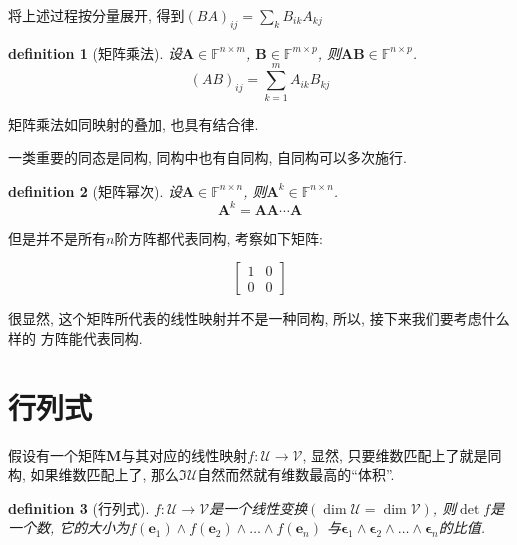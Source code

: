 \documentclass[12pt]{ctexbook}
\newtheorem{definition}{definition}
\numberwithin{definition}{section}
\numberwithin{theorem}{section}
\numberwithin{exercise}{section}
\numberwithin{example}{section}
\numberwithin{lemma}{section}
\begin{document}
    将上述过程按分量展开, 得到\({(BA)}_{ij} = \sum_{k} {B}_{ik} {A}_{kj}\)

    \begin{definition}
        [矩阵乘法] 设\(\mathbf{A} \in \mathbb{F}^{n \times m}\), \(\mathbf{B} \in \mathbb{F}^{m \times p}\), 则\(\mathbf{A}\mathbf{B} \in \mathbb{F}^{n \times p}\).
        \begin{equation}
            {(AB)}_{ij} = \sum_{k = 1}^{m} {A}_{ik} {B}_{kj}
        \end{equation}
    \end{definition}

    矩阵乘法如同映射的叠加, 也具有结合律.

    一类重要的同态是同构, 同构中也有自同构, 自同构可以多次施行.

    \begin{definition}
        [矩阵幂次] 设\(\mathbf{A} \in \mathbb{F}^{n \times n}\), 则\(\mathbf{A}^k \in \mathbb{F}^{n \times n}\).
        \begin{equation}
            \mathbf{A}^k = \mathbf{A} \mathbf{A} \cdots \mathbf{A}
        \end{equation}
    \end{definition}

    但是并不是所有\(n\)阶方阵都代表同构, 考察如下矩阵:

    \begin{equation}
        \begin{bmatrix}
            1 & 0 \\
            0 & 0
        \end{bmatrix}
    \end{equation}

    很显然, 这个矩阵所代表的线性映射并不是一种同构, 所以, 接下来我们要考虑什么样的
    方阵能代表同构.

    \section{行列式}

    假设有一个矩阵\(\mathbf{M}\)与其对应的线性映射\(f:\mathcal{U} \to \mathcal{V}\), 
    显然, 只要维数匹配上了就是同构, 如果维数匹配上了, 那么\(\Im \mathcal{U}\)自然而然就有维数最高的``体积''.

    \begin{definition}
        [行列式] \(f:\mathcal{U}\to\mathcal{V}\)是一个线性变换\((\dim\mathcal{U} = \dim \mathcal{V})\), 
        则\(\det f\)是一个数, 它的大小为\(f(\boldsymbol{e}_1) \wedge f(\boldsymbol{e}_2) \wedge \ldots \wedge f(\boldsymbol{e}_n)\)
        与\(\boldsymbol{\epsilon}_1 \wedge \boldsymbol{\epsilon}_2 \wedge \ldots \wedge \boldsymbol{\epsilon}_n\)的比值.
    \end{definition}
\end{document}
